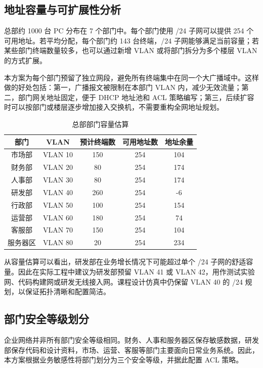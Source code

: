 \documentclass[12pt,a4paper]{ctexart}
\begin{document}
\subsection{地址容量与可扩展性分析}

总部约 1000 台 PC 分布在 7 个部门中。每个部门使用 /24 子网可以提供 254 个可用地址。若平均分配，每个部门约 143 台终端，/24 子网能够满足当前容量；若某些部门终端数量较多，也可以通过新增 VLAN 或将部门拆分为多个楼层 VLAN 的方式扩展。

本方案为每个部门预留了独立网段，避免所有终端集中在同一个大广播域中。这样做的好处包括：第一，广播报文被限制在本部门 VLAN 内，减少无效流量；第二，部门网关地址固定，便于 DHCP 地址池和 ACL 策略编写；第三，后续扩容时可以按部门或楼层逐步增加接入交换机，不需要重构全网地址规划。

\begin{table}[H]
\centering
\caption{总部部门容量估算}
\label{tab:capacity}
\begin{tabular}{|c|c|c|c|c|}
\hline
\textbf{部门} & \textbf{VLAN} & \textbf{预计终端数} & \textbf{可用地址数} & \textbf{地址余量} \\ \hline
市场部 & VLAN 10 & 150 & 254 & 104 \\ \hline
财务部 & VLAN 20 & 80 & 254 & 174 \\ \hline
人事部 & VLAN 30 & 80 & 254 & 174 \\ \hline
研发部 & VLAN 40 & 260 & 254 & -6 \\ \hline
行政部 & VLAN 50 & 100 & 254 & 154 \\ \hline
运营部 & VLAN 60 & 180 & 254 & 74 \\ \hline
客服部 & VLAN 70 & 150 & 254 & 104 \\ \hline
服务器区 & VLAN 80 & 20 & 254 & 234 \\ \hline
\end{tabular}
\end{table}

从容量估算可以看出，研发部在业务增长情况下可能超过单个 /24 子网的舒适容量。因此在实际工程中建议为研发部预留 VLAN 41 或 VLAN 42，用作测试实验网、代码构建网或研发无线接入网。课程设计仿真中仍保留 VLAN 40 的 /24 规划，以保证拓扑清晰和配置简洁。

\subsection{部门安全等级划分}

企业网络并非所有部门安全等级相同。财务、人事和服务器区保存敏感数据，研发部保存代码和设计资料，市场、运营、客服等部门主要面向日常业务系统。因此，本方案根据业务敏感性将部门划分为三个安全等级，并据此配置 ACL 策略。
\end{document}
